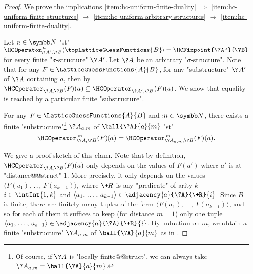 \begin{proof}
	We prove the implications
	\eqref{item:hc-uniform-finite-duality} $\Rightarrow$
	\eqref{item:hc-uniform-finite-structures} $\Rightarrow$
	\eqref{item:hc-uniform-arbitrary-structures} $\Rightarrow$
	\eqref{item:hc-uniform-finite-duality}.
	
	Let $n\in \N$ "st" $\HCOperator^{\,n}_{\!\?A',\?B}(\topLatticeGuessFunctions{B}) = \HCFixpoint{\?A'}{\?B}$ for every finite "$\sigma$-structure" $\?A'$. Let $\?A$ be an arbitrary
	"$\sigma$-structure". Note that for any $F\in \LatticeGuessFunctions{A}{B}$, for any 
	"substructure" $\?A'$ of $\?A$ containing $a$, then by 
	$\HCOperator_{\?A,\?B}(F)(a) \subseteq \HCOperator_{\?A',\?B}(F)(a)$.
	We show that equality is reached by a particular finite "substructure".
	\begin{claim}
		\label{claim:hyperedge-consistency-ball}
		For any $F\in \LatticeGuessFunctions{A}{B}$ and $m\in \N$,
		there exists a finite "substructure"\footnote{Of course, if $\?A$ is "locally finite@@struct",
		we can always take $\?A_{a,m} = \ball{\?A}{a}{m}$.}
		$\?A_{a,m}$ of $\ball{\?A}{a}{m}$ "st"
		\[\HCOperator^{\,m}_{\?A,\?B}(F)(a) = \HCOperator^{\,m}_{\?A_{a,m},\?B}(F)(a).\]
	\end{claim}
	We give a proof sketch of this claim. Note that by definition,
	$\HCOperator_{\?A,\?B}(F)(a)$ only depends on the values of $F(a')$ where $a'$ is at "distance@@struct" 1.
	More precisely, it only depends on the values
	$\langle F(a_1),\,\dotsc,\,F(a_{k-1}) \rangle$, where $\+R$ is any "predicate" of arity $k$,
	$i\in\intInt{1,k}$ and $\langle a_1,\,\dotsc,\,a_{k-1}\rangle \in \adjacency{a}{\?A}{\+R}{i}$.
	Since $B$ is finite, there are finitely many tuples
	of the form $\langle F(a_1),\,\dotsc,\,F(a_{k-1}) \rangle$, and so for each of them it suffices
	to keep (for distance $m=1$) only one tuple $\langle a_1,\,\dotsc,\,a_{k-1}\rangle \in \adjacency{a}{\?A}{\+R}{i}$. By induction on $m$, we
	obtain a finite "substructure" $\?A_{a,m}$ of $\ball{\?A}{a}{m}$ as in
	.


\end{proof}
